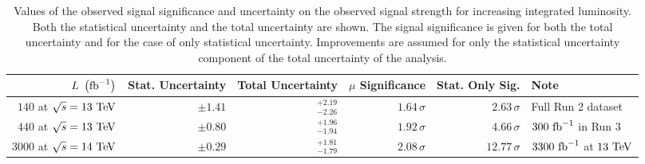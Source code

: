 \begin{table}[htbp]
 \centering
 \caption[Values of the observed signal significance and uncertainty on the observed signal strength for increasing integrated luminosity.]{%
  Values of the observed signal significance and uncertainty on the observed signal strength for increasing integrated luminosity.
  Both the statistical uncertainty and the total uncertainty are shown.
  The signal significance is given for both the total uncertainty and for the case of only statistical uncertainty.
  Improvements are assumed for only the statistical uncertainty component of the total uncertainty of the analysis.}
 \label{table:signal_significance_lumi_scaling}
 \begin{adjustbox}{max width=\textwidth}
  \begin{tabular}{@{}rrrrrl@{}} \toprule
   $L~\left(\mathrm{fb}^{-1}\right)$        & Stat. Uncertainty & Total Uncertainty  & $\mu$ Significance & Stat. Only Sig. & Note                     \\ \midrule
   $140$ at $\sqrt{s}=13~\mathrm{TeV}$  & $\pm1.41$         & $_{-2.26}^{+2.19}$ & $1.64\,\sigma$     & $2.63\,\sigma$  & Full Run 2 dataset       \\
   $440$ at $\sqrt{s}=13~\mathrm{TeV}$  & $\pm0.80$         & $_{-1.94}^{+1.96}$ & $1.92\,\sigma$     & $4.66\,\sigma$  & $300~\mathrm{fb}^{-1}$ in Run 3      \\
   $3000$ at $\sqrt{s}=14~\mathrm{TeV}$ & $\pm0.29$         & $_{-1.79}^{+1.81}$ & $2.08\,\sigma$     & $12.77\,\sigma$ & $3300~\mathrm{fb}^{-1}$ at $13~\mathrm{TeV}$ \\
   \bottomrule
  \end{tabular}
 \end{adjustbox}
\end{table}

